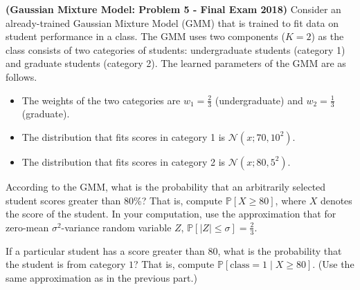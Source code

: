 \documentclass{article}
\newcommand{\probP}{\mathds{P}}
\theoremstyle{definition}
\begin{document}
\begin{question}[start=1]
	\item \textbf{(Gaussian Mixture Model: Problem 5 - Final Exam 2018)} Consider an already-trained Gaussian Mixture Model (GMM) that is trained to fit data on student performance in a class. The GMM uses two components ($K = 2$) as the class consists of two categories of students: undergraduate students (category 1) and graduate students (category 2). The learned parameters of the GMM are as follows.
	\begin{itemize}
		\item The weights of the two categories are $w_1 = \frac{2}{3}$ (undergraduate) and $w_2 = \frac{1}{3}$ (graduate).
		\item The distribution that fits scores in category 1 is $\mathcal{N}\left(x; 70, 10^2\right)$.
		\item The distribution that fits scores in category 2 is $\mathcal{N}\left(x; 80, 5^2\right)$.
	\end{itemize}
	\begin{question}
		\item According to the GMM, what is the probability that an arbitrarily selected student scores greater than $80$\%? That is, compute $\probP[X \geq 80]$, where $X$ denotes the score of the student. In your computation, use the approximation that for zero-mean $\sigma^2$-variance random variable $Z$, $\probP[\mid\! Z\!\mid \leq \sigma] = \frac{2}{3}$.
		\item If a particular student has a score greater than $80$, what is the probability that the student is from category $1$? That is, compute $\probP[\text{class} = 1 \mid X \geq 80]$. (Use the same approximation as in the previous part.)
	\end{question}
\end{question}
\end{document}
